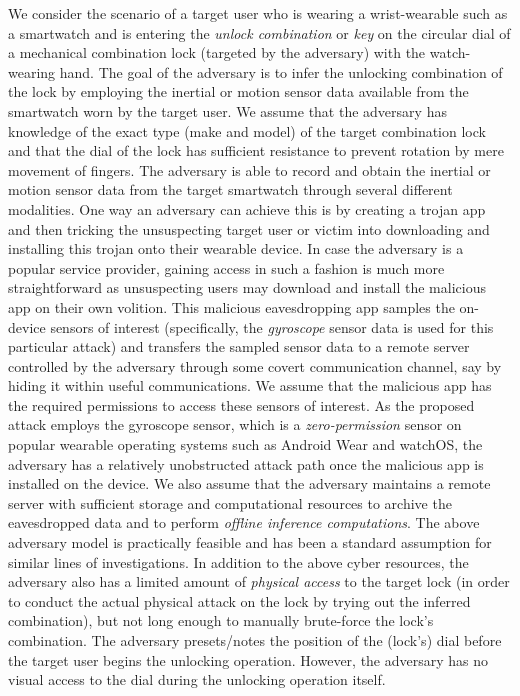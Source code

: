 \documentclass[]{IEEEtran}
\begin{document}
We consider the scenario of a target user who is wearing a wrist-wearable such as a smartwatch and is entering the \emph{unlock combination} or \emph{key} on the circular dial of a mechanical combination lock (targeted by the adversary) with the watch-wearing hand. The goal of the adversary is to infer the unlocking combination of the lock by employing the inertial or motion sensor data available from the smartwatch worn by the target user. We assume that the adversary has knowledge of the exact type (make and model) of the target combination lock and that the dial of the lock has sufficient resistance to prevent rotation by mere movement of fingers.
The adversary is able to record and obtain the inertial or motion sensor data from the target smartwatch through several different modalities.
One way an adversary can achieve this is by creating a trojan app and then tricking the unsuspecting target user or victim into downloading and installing this trojan onto their wearable device. In case the adversary is a popular service provider, gaining access in such a fashion is much more straightforward as unsuspecting users may download and install the malicious app on their own volition. This malicious eavesdropping app samples the on-device sensors of interest (specifically, the \emph{gyroscope} sensor data is used for this particular attack) and transfers the sampled sensor data to a remote server controlled by the adversary through some covert communication channel, say by hiding it within useful communications.
We assume that the malicious app has the required permissions to access these sensors of interest. As the proposed attack employs the gyroscope sensor, which is a \emph{zero-permission} sensor on popular wearable operating systems such as Android Wear and watchOS, the adversary has a relatively unobstructed attack path once the malicious app is installed on the device. We also assume that the adversary maintains a remote server with sufficient storage and computational resources to archive the eavesdropped data and to perform \emph{offline inference computations}. The above adversary model is practically feasible and has been a standard assumption for similar lines of investigations. In addition to the above cyber resources, the adversary also has a limited amount of \emph{physical access} to the target lock (in order to conduct the actual physical attack on the lock by trying out the inferred combination), but not long enough to manually brute-force the lock's combination. The adversary presets/notes the position of the (lock's) dial before the target user begins the unlocking operation. However, the adversary has no visual access to the dial during the unlocking operation itself.
\end{document}
